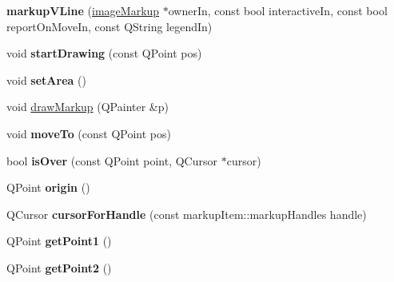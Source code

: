 \begin{DoxyCompactItemize}
\item 
\hypertarget{classmarkupVLine_a80f4f99affe9283b446df869653c97fb}{
{\bfseries markupVLine} (\hyperlink{classimageMarkup}{imageMarkup} $\ast$ownerIn, const bool interactiveIn, const bool reportOnMoveIn, const QString legendIn)}
\label{classmarkupVLine_a80f4f99affe9283b446df869653c97fb}

\item 
\hypertarget{classmarkupVLine_a66fc9bf5d533eb1665706ebe94b9d0f4}{
void {\bfseries startDrawing} (const QPoint pos)}
\label{classmarkupVLine_a66fc9bf5d533eb1665706ebe94b9d0f4}

\item 
\hypertarget{classmarkupVLine_adafd13c9dd29d233da521c9a9af14069}{
void {\bfseries setArea} ()}
\label{classmarkupVLine_adafd13c9dd29d233da521c9a9af14069}

\item 
void \hyperlink{classmarkupVLine_af472c2fb30fa50d178f3ded4f9191501}{drawMarkup} (QPainter \&p)
\item 
\hypertarget{classmarkupVLine_a43293f707098584cca7342353d5ac7bc}{
void {\bfseries moveTo} (const QPoint pos)}
\label{classmarkupVLine_a43293f707098584cca7342353d5ac7bc}

\item 
\hypertarget{classmarkupVLine_a65e90b752c08aa71c287004e2d7e0a53}{
bool {\bfseries isOver} (const QPoint point, QCursor $\ast$cursor)}
\label{classmarkupVLine_a65e90b752c08aa71c287004e2d7e0a53}

\item 
\hypertarget{classmarkupVLine_ac67fe2d2b7768cfb6836682ef517e421}{
QPoint {\bfseries origin} ()}
\label{classmarkupVLine_ac67fe2d2b7768cfb6836682ef517e421}

\item 
\hypertarget{classmarkupVLine_a197cf853a40951660dd35706070808b9}{
QCursor {\bfseries cursorForHandle} (const markupItem::markupHandles handle)}
\label{classmarkupVLine_a197cf853a40951660dd35706070808b9}

\item 
\hypertarget{classmarkupVLine_ab5c9a3ee21f4503d5aa0126fc1b02dca}{
QPoint {\bfseries getPoint1} ()}
\label{classmarkupVLine_ab5c9a3ee21f4503d5aa0126fc1b02dca}

\item 
\hypertarget{classmarkupVLine_a5119650e1e929020eaf5b12e42a93866}{
QPoint {\bfseries getPoint2} ()}
\label{classmarkupVLine_a5119650e1e929020eaf5b12e42a93866}


\end{DoxyCompactItemize}
